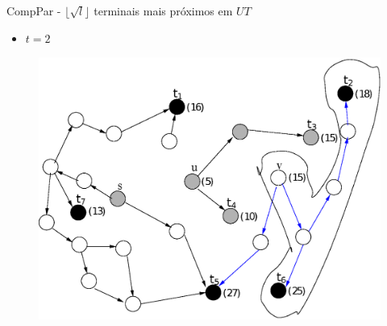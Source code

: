 \documentclass[10pt]{beamer}
\begin{document}
\begin{frame}{CompPar - $\lfloor \sqrt{l} \rfloor$ terminais mais próximos em $UT$}
\begin{itemize}
  \item $t = 2$
\end{itemize}
\begin{figure}[H]
\centering
\includegraphics[scale=0.45]{imagens/compPar_tree2}
\label{fig:fig}
\end{figure}
\end{frame}
\end{document}
